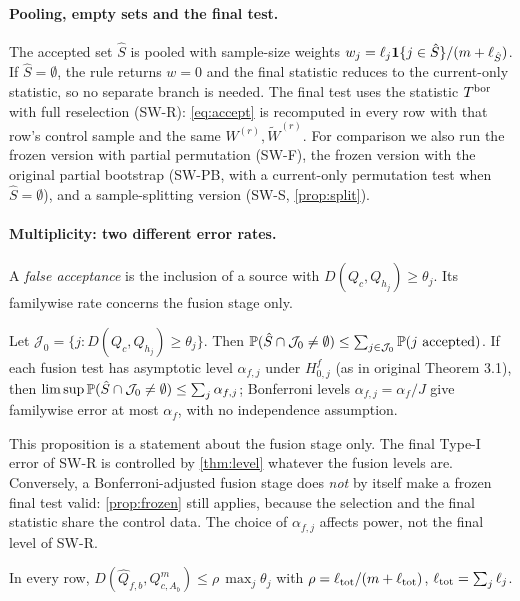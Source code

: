 \documentclass[11pt,a4paper]{article}
\begin{document}
\paragraph{Pooling, empty sets and the final test.} The accepted set $\hat S$ is pooled with sample-size weights $w_j=\ell_j\1\{j\in\hat S\}/(m+\ell_{\hat S})$. If $\hat S=\emptyset$, the rule returns $w=0$ and the final statistic reduces to the current-only statistic, so no separate branch is needed. The final test uses the statistic $T^{\rm bor}$ with full reselection (SW-R): \eqref{eq:accept} is recomputed in every row with that row's control sample and the same $W^{(r)},\tilde W^{(r)}$. For comparison we also run the frozen version with partial permutation (SW-F), the frozen version with the original partial bootstrap (SW-PB, with a current-only permutation test when $\hat S=\emptyset$), and a sample-splitting version (SW-S, \cref{prop:split}).

\paragraph{Multiplicity: two different error rates.} A \emph{false acceptance} is the inclusion of a source with $D(Q_c,Q_{h_j})\ge\theta_j$. Its familywise rate concerns the fusion stage only.

\begin{proposition}\label{prop:fwer}
Let $\mathcal J_0=\{j:D(Q_c,Q_{h_j})\ge\theta_j\}$. Then $\P(\hat S\cap\mathcal J_0\neq\emptyset)\le\sum_{j\in\mathcal J_0}\P(\text{$j$ accepted})$. If each fusion test has asymptotic level $\alpha_{f,j}$ under $H^f_{0,j}$ (as in original Theorem 3.1), then $\limsup\P(\hat S\cap\mathcal J_0\neq\emptyset)\le\sum_j\alpha_{f,j}$; Bonferroni levels $\alpha_{f,j}=\alpha_f/J$ give familywise error at most $\alpha_f$, with no independence assumption.
\end{proposition}

This proposition is a statement about the fusion stage only. The final Type-I error of SW-R is controlled by \cref{thm:level} whatever the fusion levels are. Conversely, a Bonferroni-adjusted fusion stage does \emph{not} by itself make a frozen final test valid: \cref{prop:frozen} still applies, because the selection and the final statistic share the control data. The choice of $\alpha_{f,j}$ affects power, not the final level of SW-R.

\begin{lemma}\label{lem:gate}
In every row, $D(\hat Q_{f,b},Q^m_{c,A_b})\le\rho\,\max_j\theta_j$ with $\rho=\ell_{\rm tot}/(m+\ell_{\rm tot})$, $\ell_{\rm tot}=\sum_j\ell_j$.
\end{lemma}
\end{document}
